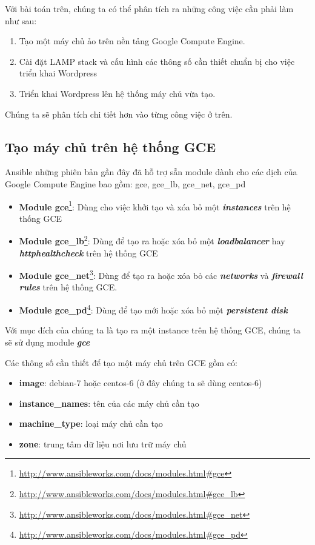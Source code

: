 Với bài toán trên, chúng ta có thể phân tích ra những công việc cần phải làm như sau:

\begin{enumerate}
\item Tạo một máy chủ ảo trên nền tảng Google Compute Engine.
\item Cài đặt LAMP stack và cấu hình các thông số cần thiết chuẩn bị cho việc triển khai Wordpress
\item Triển khai Wordpress lên hệ thống máy chủ vừa tạo.
\end{enumerate}

Chúng ta sẽ phân tích chi tiết hơn vào từng công việc ở trên.

\subsection{Tạo máy chủ trên hệ thống GCE}

Ansible những phiên bản gần đây đã hỗ trợ sẵn module dành cho các dịch của Google Compute Engine bao gồm: gce, gce\_lb, gce\_net, gce\_pd

\begin{itemize}
\item \textbf{Module gce}\footnote{\url{http://www.ansibleworks.com/docs/modules.html\#gce}}: Dùng cho việc khởi tạo và xóa bỏ một \textbf{\textit{instances}} trên  hệ thống GCE
\item \textbf{Module gce\_lb}\footnote{\url{http://www.ansibleworks.com/docs/modules.html\#gce\_lb}}: Dùng để tạo ra hoặc xóa bỏ một \textbf{\textit{loadbalancer}} hay \textbf{\textit{httphealthcheck}} trên hệ thống GCE
\item \textbf{Module gce\_net}\footnote{\url{http://www.ansibleworks.com/docs/modules.html\#gce\_net}}: Dùng để tạo ra hoặc xóa bỏ các \textbf{\textit{networks}} và \textbf{\textit{firewall rules}} trên hệ thống GCE.
\item \textbf{Module gce\_pd}\footnote{\url{http://www.ansibleworks.com/docs/modules.html\#gce\_pd}}: Dùng để tạo mới hoặc xóa bỏ một \textbf{\textit{persistent disk}}
\end{itemize}

Với mục đích của chúng ta là tạo ra một instance trên hệ thống GCE, chúng ta sẽ sử dụng module \textbf{\textit{gce}}

Các thông số cần thiết để tạo một máy chủ trên GCE gồm có:

\begin{itemize}
\item \textbf{image}: debian-7 hoặc centos-6 (ở đây chúng ta sẽ dùng centos-6)
\item \textbf{instance\_names}: tên của các máy chủ cần tạo
\item \textbf{machine\_type}: loại máy chủ cần tạo
\item \textbf{zone}: trung tâm dữ liệu nơi lưu trữ máy chủ
\end{itemize}

